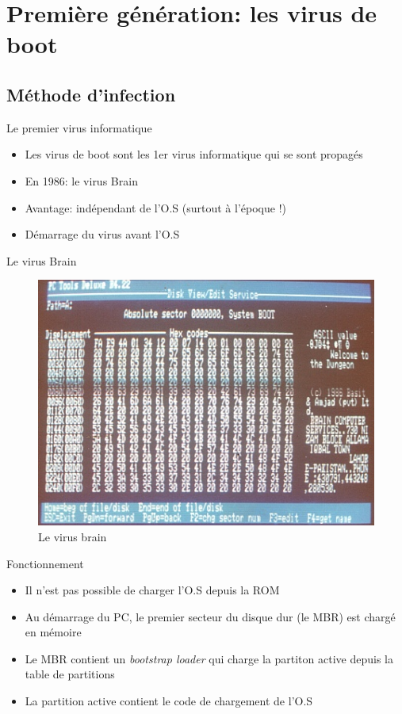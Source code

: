 \documentclass{beamer}
\begin{document}
\section{Première génération: les virus de boot}
\subsection{Méthode d'infection}

\begin{frame}{Le premier virus informatique}
\begin{itemize}
\item Les virus de boot sont les 1er virus informatique qui se sont propagés
\item En 1986: le virus Brain
\item Avantage: indépendant de l'O.S (surtout à l'époque !)
\item Démarrage du virus avant l'O.S
\end{itemize}
\end{frame}



\begin{frame}{Le virus Brain}
\begin{figure}[!ht]
\includegraphics[scale=0.5]{brain.jpg}
\center
\caption{Le virus brain}
\end{figure}
\end{frame}

\begin{frame}{Fonctionnement}
\begin{itemize}
\item Il n'est pas possible de charger l'O.S depuis la ROM
\item Au démarrage du PC, le premier secteur du disque dur (le MBR) est chargé en mémoire 
\item Le MBR contient  un \textit{bootstrap loader} qui charge la partiton active depuis la table de partitions
\item La partition active contient le code de chargement de l'O.S
\end{itemize}
\end{frame}
\end{document}
